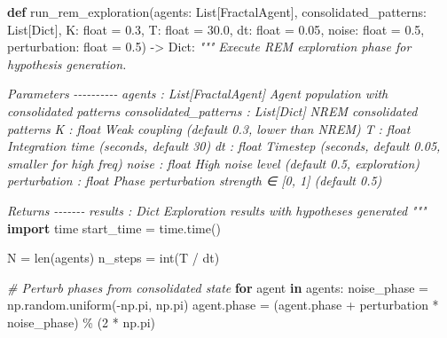 \documentclass[
]{article}
\newenvironment{Shaded}{}{}
\newcommand{\BuiltInTok}[1]{\textcolor[rgb]{0.00,0.50,0.00}{#1}}
\newcommand{\CommentTok}[1]{\textcolor[rgb]{0.38,0.63,0.69}{\textit{#1}}}
\newcommand{\ControlFlowTok}[1]{\textcolor[rgb]{0.00,0.44,0.13}{\textbf{#1}}}
\newcommand{\DecValTok}[1]{\textcolor[rgb]{0.25,0.63,0.44}{#1}}
\newcommand{\FloatTok}[1]{\textcolor[rgb]{0.25,0.63,0.44}{#1}}
\newcommand{\ImportTok}[1]{\textcolor[rgb]{0.00,0.50,0.00}{\textbf{#1}}}
\newcommand{\KeywordTok}[1]{\textcolor[rgb]{0.00,0.44,0.13}{\textbf{#1}}}
\newcommand{\NormalTok}[1]{#1}
\newcommand{\OperatorTok}[1]{\textcolor[rgb]{0.40,0.40,0.40}{#1}}
\begin{document}
\begin{Shaded}
\begin{Highlighting}[]
\KeywordTok{def}\NormalTok{ run\_rem\_exploration(agents: List[FractalAgent],}
\NormalTok{                       consolidated\_patterns: List[Dict],}
\NormalTok{                       K: }\BuiltInTok{float} \OperatorTok{=} \FloatTok{0.3}\NormalTok{,}
\NormalTok{                       T: }\BuiltInTok{float} \OperatorTok{=} \FloatTok{30.0}\NormalTok{,}
\NormalTok{                       dt: }\BuiltInTok{float} \OperatorTok{=} \FloatTok{0.05}\NormalTok{,}
\NormalTok{                       noise: }\BuiltInTok{float} \OperatorTok{=} \FloatTok{0.5}\NormalTok{,}
\NormalTok{                       perturbation: }\BuiltInTok{float} \OperatorTok{=} \FloatTok{0.5}\NormalTok{) }\OperatorTok{{-}\textgreater{}}\NormalTok{ Dict:}
    \CommentTok{"""}
\CommentTok{    Execute REM exploration phase for hypothesis generation.}

\CommentTok{    Parameters}
\CommentTok{    {-}{-}{-}{-}{-}{-}{-}{-}{-}{-}}
\CommentTok{    agents : List[FractalAgent]}
\CommentTok{        Agent population with consolidated patterns}
\CommentTok{    consolidated\_patterns : List[Dict]}
\CommentTok{        NREM consolidated patterns}
\CommentTok{    K : float}
\CommentTok{        Weak coupling (default 0.3, lower than NREM)}
\CommentTok{    T : float}
\CommentTok{        Integration time (seconds, default 30)}
\CommentTok{    dt : float}
\CommentTok{        Timestep (seconds, default 0.05, smaller for high freq)}
\CommentTok{    noise : float}
\CommentTok{        High noise level (default 0.5, exploration)}
\CommentTok{    perturbation : float}
\CommentTok{        Phase perturbation strength ∈ [0, 1] (default 0.5)}

\CommentTok{    Returns}
\CommentTok{    {-}{-}{-}{-}{-}{-}{-}}
\CommentTok{    results : Dict}
\CommentTok{        Exploration results with hypotheses generated}
\CommentTok{    """}
    \ImportTok{import}\NormalTok{ time}
\NormalTok{    start\_time }\OperatorTok{=}\NormalTok{ time.time()}

\NormalTok{    N }\OperatorTok{=} \BuiltInTok{len}\NormalTok{(agents)}
\NormalTok{    n\_steps }\OperatorTok{=} \BuiltInTok{int}\NormalTok{(T }\OperatorTok{/}\NormalTok{ dt)}

    \CommentTok{\# Perturb phases from consolidated state}
    \ControlFlowTok{for}\NormalTok{ agent }\KeywordTok{in}\NormalTok{ agents:}
\NormalTok{        noise\_phase }\OperatorTok{=}\NormalTok{ np.random.uniform(}\OperatorTok{{-}}\NormalTok{np.pi, np.pi)}
\NormalTok{        agent.phase }\OperatorTok{=}\NormalTok{ (agent.phase }\OperatorTok{+}\NormalTok{ perturbation }\OperatorTok{*}\NormalTok{ noise\_phase) }\OperatorTok{\%}\NormalTok{ (}\DecValTok{2} \OperatorTok{*}\NormalTok{ np.pi)}


\end{Highlighting}
\end{Shaded}
\end{document}
